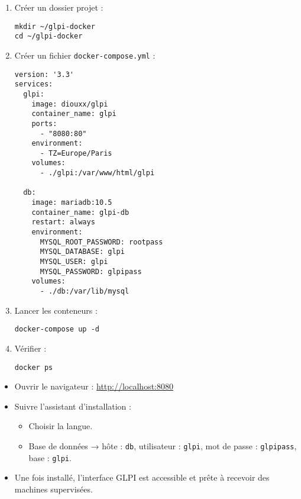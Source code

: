 \documentclass[11pt,a4paper]{article}
\begin{document}
\begin{tcolorbox}[title={4. Déploiement de GLPI via Docker Compose}]
\begin{enumerate}
  \item Créer un dossier projet :
\begin{verbatim}
mkdir ~/glpi-docker
cd ~/glpi-docker
\end{verbatim}

  \item Créer un fichier \texttt{docker-compose.yml} :
\begin{verbatim}
version: '3.3'
services:
  glpi:
    image: diouxx/glpi
    container_name: glpi
    ports:
      - "8080:80"
    environment:
      - TZ=Europe/Paris
    volumes:
      - ./glpi:/var/www/html/glpi

  db:
    image: mariadb:10.5
    container_name: glpi-db
    restart: always
    environment:
      MYSQL_ROOT_PASSWORD: rootpass
      MYSQL_DATABASE: glpi
      MYSQL_USER: glpi
      MYSQL_PASSWORD: glpipass
    volumes:
      - ./db:/var/lib/mysql
\end{verbatim}

  \item Lancer les conteneurs :
\begin{verbatim}
docker-compose up -d
\end{verbatim}

  \item Vérifier :
\begin{verbatim}
docker ps
\end{verbatim}
\end{enumerate}
\end{tcolorbox}

\begin{tcolorbox}[title={5. Accéder à GLPI}]
\begin{itemize}
  \item Ouvrir le navigateur : \url{http://localhost:8080}  
  \item Suivre l’assistant d’installation :  
    \begin{itemize}
      \item Choisir la langue.  
      \item Base de données → hôte : \texttt{db}, utilisateur : \texttt{glpi}, mot de passe : \texttt{glpipass}, base : \texttt{glpi}.  
    \end{itemize}
  \item Une fois installé, l’interface GLPI est accessible et prête à recevoir des machines supervisées.
\end{itemize}
\end{tcolorbox}
\end{document}
